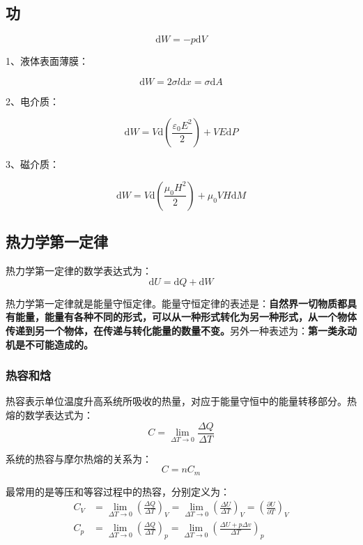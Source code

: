 \documentclass[UTF8]{ctexart}
\newcommand{\dif}{\mathrm{d}}
\begin{document}
	\subsection{功}
	\begin{equation}
		\dif W= -p \dif V
	\end{equation}
	
	1、液体表面薄膜：
	
	\begin{equation}
		\dif W = 2 \sigma l \dif x = \sigma \dif A
	\end{equation}
	
	2、电介质：
	
	\begin{equation}
		\dif W = V \dif \left(\frac{\varepsilon_{0} E^{2}}{2}\right) + VE \dif P
	\end{equation}
	
	3、磁介质：
	
	\begin{equation}
		\dif W = V \dif \left(\frac{\mu_{0} H^{2}}{2}\right)+ \mu_{0} VH \dif M
	\end{equation}
	
	\subsection{热力学第一定律}
	热力学第一定律的数学表达式为：
	\begin{equation}
		\dif U = \dif Q +\dif W
	\end{equation}
	
	热力学第一定律就是能量守恒定律。能量守恒定律的表述是：\textbf{自然界一切物质都具有能量，能量有各种不同的形式，可以从一种形式转化为另一种形式，从一个物体传递到另一个物体，在传递与转化能量的数量不变。}另外一种表述为：\textbf{第一类永动机是不可能造成的。}
	
	\subsubsection{热容和焓}
	热容表示单位温度升高系统所吸收的热量，对应于能量守恒中的能量转移部分。热熔的数学表达式为：
	\begin{equation}
		C= \lim_{\Delta T \rightarrow 0} \frac{\Delta Q}{\Delta T}
	\end{equation}
	
\noindent 系统的热容与摩尔热熔的关系为：
\begin{equation}
	C= n C_{m}
\end{equation}
	
	最常用的是等压和等容过程中的热容，分别定义为：
	\begin{equation}
	\begin{aligned}
	C_{V}&=\lim _{\Delta T \rightarrow 0}\left(\frac{\Delta Q}{\Delta T}\right)_{V}=\lim _{\Delta T \rightarrow 0}\left(\frac{\Delta U}{\Delta T}\right)_{V}=\left(\frac{\partial U}{\partial T}\right)_{V}\\
	C_{p}&=\lim _{\Delta T \rightarrow 0}\left(\frac{\Delta Q}{\Delta T}\right)_{p}=\lim _{\Delta T \rightarrow 0}\left(\frac{\Delta U+p \Delta v}{\Delta T}\right)_{p}
	\end{aligned}
	\end{equation}
	
\end{document}
